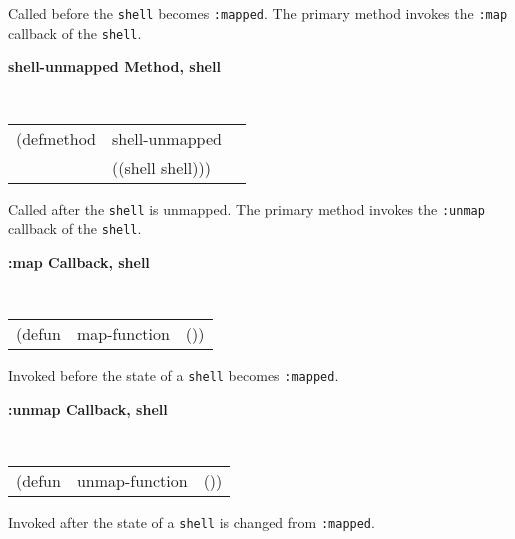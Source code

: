 \begin{flushright} \parbox[t]{6.125in}{
Called before the {\tt shell} becomes {\tt :mapped}.  The primary method invokes
the {\tt :map} callback of the {\tt shell}.

}\end{flushright}

{\samepage
{\large {\bf shell-unmapped \hfill Method, shell}}
\begin{flushright} \parbox[t]{6.125in}{
\tt
\begin{tabular}{lll}
\raggedright
(defmethod & shell-unmapped & \\
           & ((shell  shell)))
\end{tabular}
\rm

}\end{flushright}}

\begin{flushright} \parbox[t]{6.125in}{
Called after the {\tt shell} is unmapped.  The primary method invokes
the {\tt :unmap} callback of the {\tt shell}.

}\end{flushright}


{\samepage
{\large {\bf :map \hfill Callback, shell}} 
\begin{flushright} 
\parbox[t]{6.125in}{
\tt
\begin{tabular}{lll}
\raggedright
(defun & map-function & ())
\end{tabular}
\rm

}\end{flushright}}

\begin{flushright} \parbox[t]{6.125in}{
Invoked before the state of a {\tt shell} becomes {\tt :mapped}.

}\end{flushright}


{\samepage
{\large {\bf :unmap \hfill Callback, shell}} 
\begin{flushright} 
\parbox[t]{6.125in}{
\tt
\begin{tabular}{lll}
\raggedright
(defun & unmap-function & ())
\end{tabular}
\rm

}\end{flushright}}

\begin{flushright} \parbox[t]{6.125in}{
Invoked after the state of a {\tt shell} is changed from {\tt :mapped}.

}\end{flushright}


